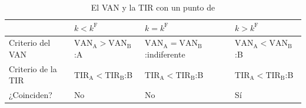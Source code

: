 \documentclass[11pt]{article}
\begin{document}
\begin{table}[H]
\centering
\caption{El VAN y la TIR con un punto de }\label{tab:van-tir}
\begin{tabular}{>{\raggedright\arraybackslash}m{2.8cm}>{\centering\arraybackslash}m{3.6cm}>{\centering\arraybackslash}m{3.6cm}>{\centering\arraybackslash}m{3.6cm}}
\toprule
\rowcolor{tceeazulpalido} & $k<k^{\mathrm F}$ & $k=k^{\mathrm F}$ & $k>k^{\mathrm F}$ \\
\midrule
Criterio del VAN & $\mathrm{VAN}_{\mathrm A}>\mathrm{VAN}_{\mathrm B}$:\newline \textcolor{tceeazul}{A} & $\mathrm{VAN}_{\mathrm A}=\mathrm{VAN}_{\mathrm B}$:\newline indiferente & $\mathrm{VAN}_{\mathrm A}<\mathrm{VAN}_{\mathrm B}$:\newline \textcolor{tceeverde}{B} \\
Criterio de la TIR & $\mathrm{TIR}_{\mathrm A}<\mathrm{TIR}_{\mathrm B}$:\newline \textcolor{tceeverde}{B} & $\mathrm{TIR}_{\mathrm A}<\mathrm{TIR}_{\mathrm B}$:\newline \textcolor{tceeverde}{B} & $\mathrm{TIR}_{\mathrm A}<\mathrm{TIR}_{\mathrm B}$:\newline \textcolor{tceeverde}{B} \\
\rowcolor{tceesalvia}¿Coinciden? & \textcolor{tceerojo}{No} & \textcolor{tceerojo}{No} & \textcolor{tceeverde}{Sí} \\
\bottomrule
\end{tabular}
\end{table}
\end{document}
